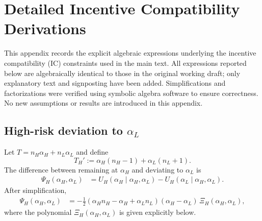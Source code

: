 \documentclass[a4paper,12pt]{article}
\theoremstyle{definition}
\theoremstyle{remark}
\newcommand{\1}{\mathbf{1}}
\begin{document}
\appendix

\section{Detailed Incentive Compatibility Derivations}\label{app:IC}

This appendix records the explicit algebraic expressions underlying the
incentive compatibility (IC) constraints used in the main text. All expressions
reported below are algebraically identical to those in the original working
draft; only explanatory text and signposting have been added. Simplifications
and factorizations were verified using symbolic algebra software to ensure
correctness. No new assumptions or results are introduced in this appendix.

\subsection{High-risk deviation to $\alpha_L$}\label{app:IC-H}

Let $T = n_H \alpha_H + n_L \alpha_L$ and define
\[
    T_H' := \alpha_H(n_H-1) + \alpha_L(n_L+1).
\]
The difference between remaining at $\alpha_H$ and deviating to $\alpha_L$ is
\begin{align}
    \Psi_H(\alpha_H,\alpha_L)
    &= U_H(\alpha_H \mid \alpha_H,\alpha_L)
       - U_H(\alpha_L \mid \alpha_H,\alpha_L).
\end{align}
After simplification,
\begin{align}
    \Psi_H(\alpha_H,\alpha_L)
    &= -\frac{1}{2}
       (\alpha_H n_H - \alpha_H + \alpha_L n_L)
       (\alpha_H - \alpha_L)\,
       \Xi_H(\alpha_H,\alpha_L), \label{eq:PsiH-app}
\end{align}
where the polynomial $\Xi_H(\alpha_H,\alpha_L)$ is given explicitly below.
\end{document}
